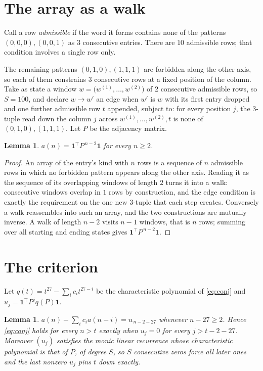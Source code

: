 \documentclass[11pt,a4paper]{article}
\theoremstyle{plain}
\newtheorem{lemma}[theorem]{Lemma}
\theoremstyle{definition}
\begin{document}
\section{The array as a walk}

Call a row \emph{admissible} if the word it forms contains none of the patterns
$(0,0,0), (0,0,1)$ as $3$ consecutive entries. There are $10$ admissible rows; that condition
involves a single row only.

The remaining patterns $(0,1,0), (1,1,1)$ are forbidden along the other axis, so each of them
constrains $3$ consecutive rows at a fixed position of the column. Take as state a
window $w=\bigl(w^{(1)},\dots,w^{(2)}\bigr)$ of $2$ consecutive admissible
rows, so $S=100$, and declare $w\to w'$ an edge when $w'$ is $w$ with its first entry
dropped and one further admissible row $t$ appended, subject to: for every position
$j$, the $3$-tuple read down the column $j$ across $w^{(1)},\dots,w^{(2)},t$
is none of $(0,1,0), (1,1,1)$. Let $P$ be the adjacency matrix.

\begin{lemma}\label{lem:walk}
$a(n)=\mathbf{1}^{\!\top}P^{\,n-2}\mathbf{1}$ for every $n\ge2$.
\end{lemma}

\begin{proof}
An array of the entry's kind with $n$ rows is a sequence of $n$ admissible rows in
which no forbidden pattern appears along the other axis. Reading it as the sequence of its
overlapping windows of length $2$ turns it into a walk: consecutive windows overlap in
$1$ rows by construction, and the edge condition is exactly the requirement on the one
new $3$-tuple that each step creates. Conversely a walk reassembles into such an array,
and the two constructions are mutually inverse. A walk of length $n-2$ visits $n-1$
windows, that is $n$ rows; summing over all starting and ending states gives
$\mathbf{1}^{\!\top}P^{\,n-2}\mathbf{1}$.
\end{proof}

\section{The criterion}

Let $q(t)=t^{27}-\sum_i c_i t^{27-i}$ be the characteristic polynomial of
\eqref{eq:conj} and $u_j=\mathbf{1}^{\!\top}P^{j}q(P)\mathbf{1}$.

\begin{lemma}\label{lem:crit}
$a(n)-\sum_i c_i a(n-i)=u_{\,n-2-27}$ whenever $n-27\ge2$. Hence
\eqref{eq:conj} holds for every $n>t$ exactly when $u_j=0$ for every
$j>t-2-27$. Moreover $(u_j)$ satisfies the monic linear recurrence whose
characteristic polynomial is that of $P$, of degree $S$, so $S$ consecutive zeros force all
later ones and the last nonzero $u_j$ pins $t$ down exactly.
\end{lemma}
\end{document}
